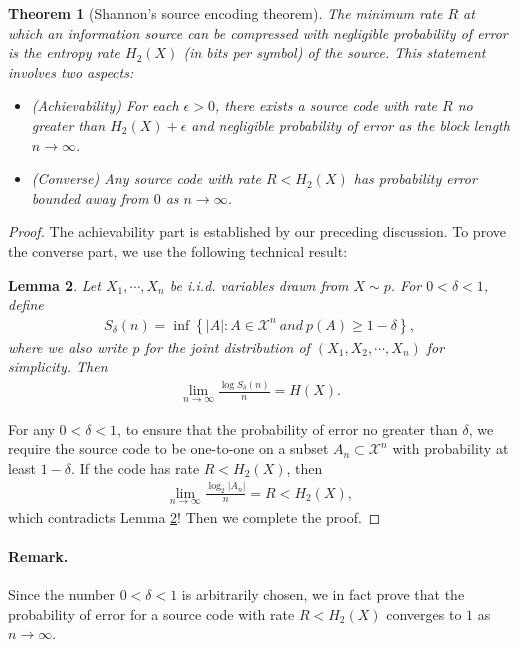 \documentclass{article}
\numberwithin{equation}{section}
\renewcommand{\cal}{\mathcal}
\theoremstyle{plain}
\newtheorem{theorem}{Theorem}[section]
\newtheorem{lemma}[theorem]{Lemma}
\theoremstyle{definition}
\begin{document}
\begin{theorem}[Shannon's source encoding theorem] The minimum rate $R$ at which an information source can be compressed with negligible probability of error is the entropy rate $H_2(X)$ (in bits per symbol) of the source. This statement involves two aspects:
\begin{itemize}
\item[(i)] (Achievability) For each $\epsilon>0$, there exists a source code with rate $R$ no greater than $H_2(X)+\epsilon$ and negligible probability of error as the block length $n\to\infty$.
\item[(ii)] (Converse) Any source code with rate $R<H_2(X)$ has probability error bounded away from $0$ as $n\to\infty$.
\end{itemize}
\end{theorem}
\begin{proof}
The achievability part is established by our preceding discussion. To prove the converse part, we use the following technical result:
\begin{lemma}\label{ub1.18}
Let $X_1,\cdots,X_n$ be i.i.d. variables drawn from $X\sim p$. For $0<\delta<1$, define
\begin{align*}
	S_\delta(n)=\inf\left\{\vert A\vert:A\in\cal{X}^n\ and\ p(A)\geq 1-\delta\right\},
\end{align*}
where we also write $p$ for the joint distribution of $(X_1,X_2,\cdots,X_n)$ for simplicity. Then
\begin{align*}
	\lim_{n\to\infty}\frac{\log S_\delta(n)}{n}=H(X).
\end{align*}
\end{lemma}
For any $0<\delta<1$, to ensure that the probability of error no greater than $\delta$, we require the source code to be one-to-one on a subset $A_n\subset\cal{X}^n$ with probability at least $1-\delta$. If the code has rate $R<H_2(X)$, then
\begin{align*}
	\lim_{n\to\infty}\frac{\log_2\vert A_n\vert}{n}=R<H_2(X),
\end{align*}
which contradicts Lemma \ref{ub1.18}! Then we complete the proof.
\end{proof}

\paragraph{Remark.} Since the number $0<\delta<1$ is arbitrarily chosen, we in fact prove that the probability of error for a source code with rate $R<H_2(X)$ converges to $1$ as $n\to\infty$.
\end{document}
